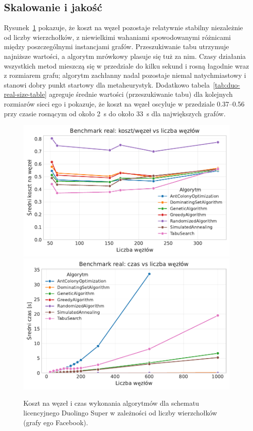 \subsection{Skalowanie i jakość}

Rysunek~\ref{fig:duo-real-size} pokazuje, że koszt na węzeł pozostaje relatywnie stabilny niezależnie od liczby wierzchołków, z niewielkimi wahaniami spowodowanymi różnicami między poszczególnymi instancjami grafów. Przeszukiwanie tabu utrzymuje najniższe wartości, a algorytm mrówkowy plasuje się tuż za nim. Czasy działania wszystkich metod mieszczą się w przedziale do kilku sekund i rosną łagodnie wraz z rozmiarem grafu; algorytm zachłanny nadal pozostaje niemal natychmiastowy i stanowi dobry punkt startowy dla metaheurystyk. Dodatkowo tabela~\ref{tab:duo-real-size-table} agreguje średnie wartości (przeszukiwanie tabu) dla kolejnych rozmiarów sieci ego i pokazuje, że koszt na węzeł oscyluje w przedziale 0.37--0.56 przy czasie rosnącym od około 2~s do około 33~s dla największych grafów.

\begin{figure}[H]
  \centering
  \includegraphics[width=0.48\linewidth]{assets/figures/benchmark/real/cost_per_node_vs_nodes.pdf}
  \hfill
  \includegraphics[width=0.48\linewidth]{assets/figures/benchmark/real/time_vs_nodes.pdf}
  \caption{Koszt na węzeł i czas wykonania algorytmów dla schematu licencyjnego Duolingo Super w zależności od liczby wierzchołków (grafy ego Facebook).}
  \label{fig:duo-real-size}
\end{figure}

